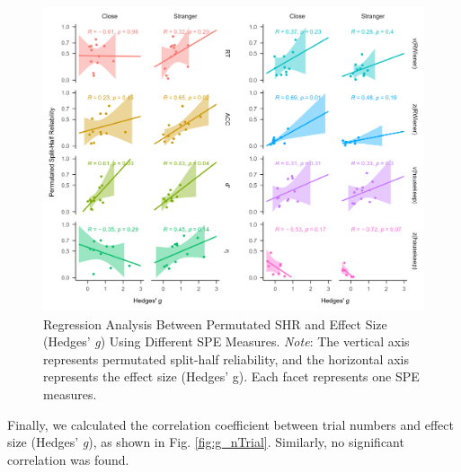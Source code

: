 \documentclass[sn-apa]{sn-jnl}%
\theoremstyle{thmstyleone}%
\theoremstyle{thmstyletwo}%
\theoremstyle{thmstylethree}%
\begin{document}
\begin{figure}[!ht]
	\centering
	\includegraphics[width=1\textwidth]{./Figure/Fig8_yi&r.png}
	\caption[Regression Analysis Between Permutated SHR and Effect Size (Hedges’ \textit{g}) Using Different SPE Measures]{Regression Analysis Between Permutated SHR and Effect Size (Hedges’ \textit{g}) Using Different SPE Measures. \textit{Note}: The vertical axis represents permutated split-half reliability, and the horizontal axis represents the effect size (Hedges’ g). Each facet represents one SPE measures.
	}\label{fig:g_r}
\end{figure}
\clearpage

Finally, we calculated the correlation coefficient between trial numbers and effect size (Hedges’ \textit{g}), as shown in Fig. \ref{fig:g_nTrial}. Similarly, no significant correlation was found.
\end{document}
